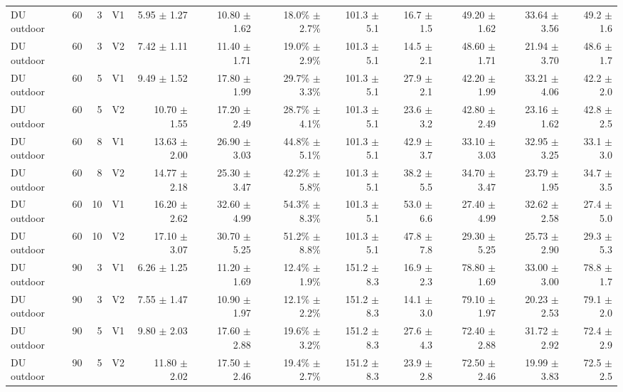 \documentclass[10pt,a4paper]{article}
\begin{document}
\begin{landscape}
\begin{longtable}{@{}lrrlrrrrrrrr@{}}
DU outdoor & 60 & 3 & V1 & 5.95 $\pm$ 1.27 & 10.80 $\pm$ 1.62 & 18.0\% $\pm$ 2.7\% & 101.3 $\pm$ 5.1 & 16.7 $\pm$ 1.5 & 49.20 $\pm$ 1.62 & 33.64 $\pm$ 3.56 & 49.2 $\pm$ 1.6 \\
DU outdoor & 60 & 3 & V2 & 7.42 $\pm$ 1.11 & 11.40 $\pm$ 1.71 & 19.0\% $\pm$ 2.9\% & 101.3 $\pm$ 5.1 & 14.5 $\pm$ 2.1 & 48.60 $\pm$ 1.71 & 21.94 $\pm$ 3.70 & 48.6 $\pm$ 1.7 \\
DU outdoor & 60 & 5 & V1 & 9.49 $\pm$ 1.52 & 17.80 $\pm$ 1.99 & 29.7\% $\pm$ 3.3\% & 101.3 $\pm$ 5.1 & 27.9 $\pm$ 2.1 & 42.20 $\pm$ 1.99 & 33.21 $\pm$ 4.06 & 42.2 $\pm$ 2.0 \\
DU outdoor & 60 & 5 & V2 & 10.70 $\pm$ 1.55 & 17.20 $\pm$ 2.49 & 28.7\% $\pm$ 4.1\% & 101.3 $\pm$ 5.1 & 23.6 $\pm$ 3.2 & 42.80 $\pm$ 2.49 & 23.16 $\pm$ 1.62 & 42.8 $\pm$ 2.5 \\
DU outdoor & 60 & 8 & V1 & 13.63 $\pm$ 2.00 & 26.90 $\pm$ 3.03 & 44.8\% $\pm$ 5.1\% & 101.3 $\pm$ 5.1 & 42.9 $\pm$ 3.7 & 33.10 $\pm$ 3.03 & 32.95 $\pm$ 3.25 & 33.1 $\pm$ 3.0 \\
DU outdoor & 60 & 8 & V2 & 14.77 $\pm$ 2.18 & 25.30 $\pm$ 3.47 & 42.2\% $\pm$ 5.8\% & 101.3 $\pm$ 5.1 & 38.2 $\pm$ 5.5 & 34.70 $\pm$ 3.47 & 23.79 $\pm$ 1.95 & 34.7 $\pm$ 3.5 \\
DU outdoor & 60 & 10 & V1 & 16.20 $\pm$ 2.62 & 32.60 $\pm$ 4.99 & 54.3\% $\pm$ 8.3\% & 101.3 $\pm$ 5.1 & 53.0 $\pm$ 6.6 & 27.40 $\pm$ 4.99 & 32.62 $\pm$ 2.58 & 27.4 $\pm$ 5.0 \\
DU outdoor & 60 & 10 & V2 & 17.10 $\pm$ 3.07 & 30.70 $\pm$ 5.25 & 51.2\% $\pm$ 8.8\% & 101.3 $\pm$ 5.1 & 47.8 $\pm$ 7.8 & 29.30 $\pm$ 5.25 & 25.73 $\pm$ 2.90 & 29.3 $\pm$ 5.3 \\
DU outdoor & 90 & 3 & V1 & 6.26 $\pm$ 1.25 & 11.20 $\pm$ 1.69 & 12.4\% $\pm$ 1.9\% & 151.2 $\pm$ 8.3 & 16.9 $\pm$ 2.3 & 78.80 $\pm$ 1.69 & 33.00 $\pm$ 3.00 & 78.8 $\pm$ 1.7 \\
DU outdoor & 90 & 3 & V2 & 7.55 $\pm$ 1.47 & 10.90 $\pm$ 1.97 & 12.1\% $\pm$ 2.2\% & 151.2 $\pm$ 8.3 & 14.1 $\pm$ 3.0 & 79.10 $\pm$ 1.97 & 20.23 $\pm$ 2.53 & 79.1 $\pm$ 2.0 \\
DU outdoor & 90 & 5 & V1 & 9.80 $\pm$ 2.03 & 17.60 $\pm$ 2.88 & 19.6\% $\pm$ 3.2\% & 151.2 $\pm$ 8.3 & 27.6 $\pm$ 4.3 & 72.40 $\pm$ 2.88 & 31.72 $\pm$ 2.92 & 72.4 $\pm$ 2.9 \\
DU outdoor & 90 & 5 & V2 & 11.80 $\pm$ 2.02 & 17.50 $\pm$ 2.46 & 19.4\% $\pm$ 2.7\% & 151.2 $\pm$ 8.3 & 23.9 $\pm$ 2.8 & 72.50 $\pm$ 2.46 & 19.99 $\pm$ 3.83 & 72.5 $\pm$ 2.5 \\

\end{longtable}
\end{landscape}
\end{document}
